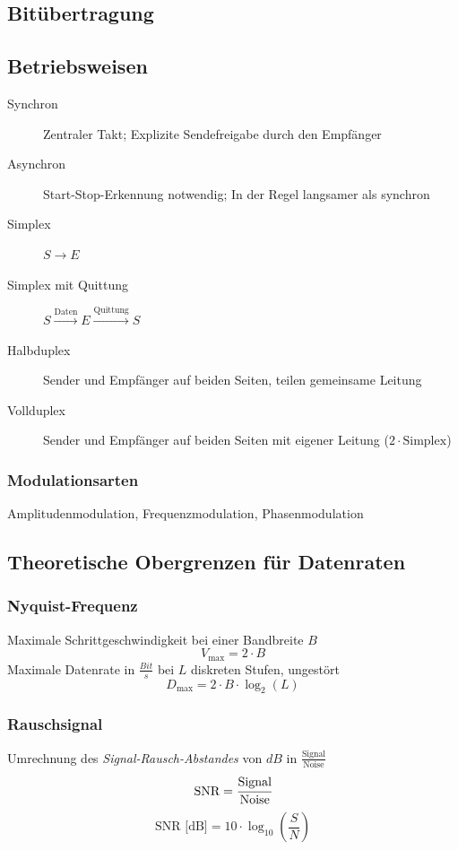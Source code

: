 \documentclass
[
	8pt,		%
	ngerman,	%
	a4paper,	%
	landscape,	%
	final		%
]{extarticle}
\begin{document}
\begin{multicols*}{4}
\section{Bitübertragung}
\subsection{Betriebsweisen}
\begin{description}
	\item[Synchron] Zentraler Takt; Explizite Sendefreigabe durch den
	      Empfänger
	\item[Asynchron] Start-Stop-Erkennung notwendig; In der Regel langsamer
	      als synchron
	\item[Simplex] \(S \rightarrow E\)
	\item[Simplex mit Quittung] \(S \overset{\text{Daten}}{\longrightarrow} E \overset{\text{Quittung}}{\longrightarrow} S\)
	\item[Halbduplex] Sender und Empfänger auf beiden Seiten, teilen
	      gemeinsame Leitung
	\item[Vollduplex] Sender und Empfänger auf beiden Seiten mit eigener
	      Leitung (\(2 \cdot \text{Simplex}\))
\end{description}
\subsubsection{Modulationsarten}
Amplitudenmodulation, Frequenzmodulation, Phasenmodulation
\subsection{Theoretische Obergrenzen für Datenraten}
\subsubsection{Nyquist-Frequenz}
Maximale Schrittgeschwindigkeit bei einer Bandbreite \(B\)
\[V_\text{max} = 2 \cdot B\]
Maximale Datenrate in \(\frac{Bit}{s}\) bei \(L\) diskreten Stufen,
ungestört \[D_\text{max} = 2 \cdot B \cdot \log_{2}(L)\]
\subsubsection{Rauschsignal}
Umrechnung des \emph{Signal-Rausch-Abstandes} von \(dB\) in
\(\frac{\text{Signal}}{\text{Noise}}\)
\[\text{SNR} = \cfrac{\text{Signal}}{\text{Noise}}\]
\[\text{SNR [dB]} = 10 \cdot \log_{10}\left(\frac{S}{N}\right)\]

\end{multicols*}
\end{document}
